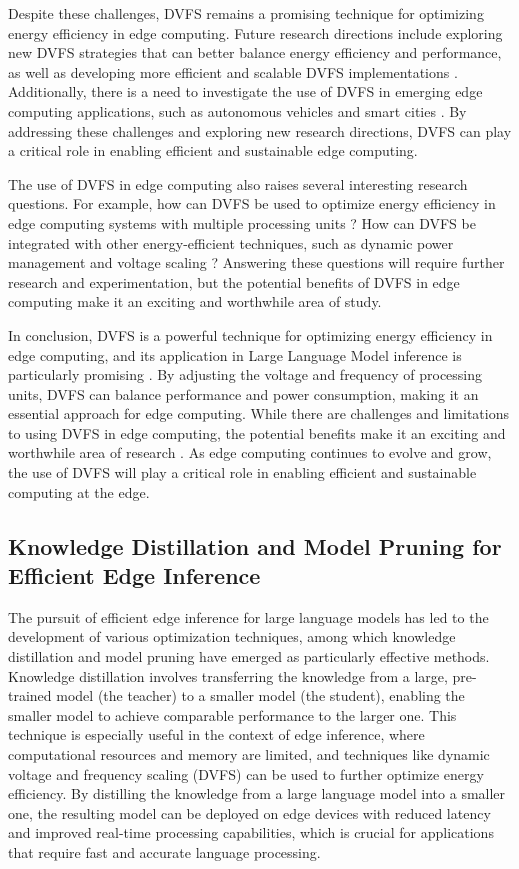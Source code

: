\documentclass[11pt,a4paper]{article}
\begin{document}
Despite these challenges, DVFS remains a promising technique for optimizing energy efficiency in edge computing. Future research directions include exploring new DVFS strategies that can better balance energy efficiency and performance, as well as developing more efficient and scalable DVFS implementations \cite{arxiv:2505.20225}. Additionally, there is a need to investigate the use of DVFS in emerging edge computing applications, such as autonomous vehicles and smart cities \cite{arxiv:2307.06148}. By addressing these challenges and exploring new research directions, DVFS can play a critical role in enabling efficient and sustainable edge computing.

The use of DVFS in edge computing also raises several interesting research questions. For example, how can DVFS be used to optimize energy efficiency in edge computing systems with multiple processing units \cite{arxiv:2410.12247}? How can DVFS be integrated with other energy-efficient techniques, such as dynamic power management and voltage scaling \cite{arxiv:2601.17063}? Answering these questions will require further research and experimentation, but the potential benefits of DVFS in edge computing make it an exciting and worthwhile area of study.

In conclusion, DVFS is a powerful technique for optimizing energy efficiency in edge computing, and its application in Large Language Model inference is particularly promising \cite{arxiv:2507.11181}. By adjusting the voltage and frequency of processing units, DVFS can balance performance and power consumption, making it an essential approach for edge computing. While there are challenges and limitations to using DVFS in edge computing, the potential benefits make it an exciting and worthwhile area of research \cite{arxiv:2601.00942}. As edge computing continues to evolve and grow, the use of DVFS will play a critical role in enabling efficient and sustainable computing at the edge.


\subsection{Knowledge Distillation and Model Pruning for Efficient Edge Inference}


The pursuit of efficient edge inference for large language models has led to the development of various optimization techniques, among which knowledge distillation and model pruning have emerged as particularly effective methods. Knowledge distillation involves transferring the knowledge from a large, pre-trained model (the teacher) to a smaller model (the student), enabling the smaller model to achieve comparable performance to the larger one. This technique is especially useful in the context of edge inference, where computational resources and memory are limited, and techniques like dynamic voltage and frequency scaling (DVFS) can be used to further optimize energy efficiency. By distilling the knowledge from a large language model into a smaller one, the resulting model can be deployed on edge devices with reduced latency and improved real-time processing capabilities, which is crucial for applications that require fast and accurate language processing.
\end{document}
